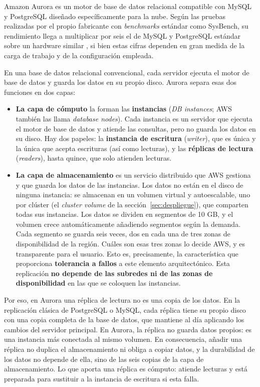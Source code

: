 \documentclass[12pt,a4paper]{article}
\begin{document}
Amazon Aurora es un motor de base de datos relacional compatible con MySQL y PostgreSQL diseñado específicamente para la nube. Según las pruebas realizadas por el propio fabricante con \textit{benchmarks} estándar como SysBench, su rendimiento llega a multiplicar por seis el de MySQL y PostgreSQL estándar sobre un hardware similar \cite{aws_aurora_performance}, si bien estas cifras dependen en gran medida de la carga de trabajo y de la configuración empleada.

En una base de datos relacional convencional, cada servidor ejecuta el motor de base de datos y guarda los datos en su propio disco. Aurora separa esas dos funciones en dos capas:

\begin{itemize}
    \item \textbf{La capa de cómputo} la forman las \textbf{instancias} (\textit{DB instances}; AWS también las llama \textit{database nodes}). Cada instancia es un servidor que ejecuta el motor de base de datos y atiende las consultas, pero no guarda los datos en su disco. Hay dos papeles: la \textbf{instancia de escritura} (\textit{writer}), que es única y la única que acepta escrituras (así como lecturas), y las \textbf{réplicas de lectura} (\textit{readers}), hasta quince, que solo atienden lecturas. 
    
    \item \textbf{La capa de almacenamiento} es un servicio distribuido que AWS gestiona y que guarda los datos de las instancias. Los datos no están en el disco de ninguna instancia: se almacenan en un volumen virtual y autoescalable, uno por clúster (el \textit{cluster volume} de la sección~\ref{sec:despliegue}), que comparten todas sus instancias. Los datos se dividen en segmentos de 10 GB, y el volumen crece automáticamente añadiendo segmentos según la demanda. Cada segmento se guarda seis veces, dos en cada una de tres zonas de disponibilidad de la región. Cuáles son esas tres zonas lo decide AWS, y es transparente para el usuario. Esto es, precisamente, la característica que proporciona \textbf{tolerancia a fallos} a este elemento arquitectónico. Esta replicación \textbf{no depende de las subredes ni de las zonas de disponibilidad} en las que se coloquen las instancias.
    
\end{itemize}

Por eso, en Aurora una réplica de lectura no es una copia de los datos. En la replicación clásica de PostgreSQL o MySQL, cada réplica tiene su propio disco con una copia completa de la base de datos, que mantiene al día aplicando los cambios del servidor principal. En Aurora, la réplica no guarda datos propios: es una instancia más conectada al mismo volumen. En consecuencia, añadir una réplica no duplica el almacenamiento ni obliga a copiar datos, y la durabilidad de los datos no depende de ella, sino de las seis copias de la capa de almacenamiento. Lo que aporta una réplica es cómputo: atiende lecturas y está preparada para sustituir a la instancia de escritura si esta falla.
\end{document}

